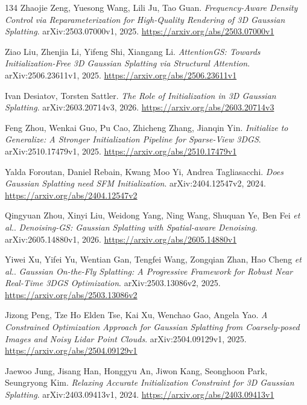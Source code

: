\documentclass[11pt,a4paper]{article}
\begin{document}
\begin{thebibliography}{134}
Zhaojie Zeng, Yuesong Wang, Lili Ju, Tao Guan.
\newblock \emph{Frequency-Aware Density Control via Reparameterization for High-Quality Rendering of 3D Gaussian Splatting}.
\newblock arXiv:2503.07000v1, 2025.
\newblock \url{https://arxiv.org/abs/2503.07000v1}

Ziao Liu, Zhenjia Li, Yifeng Shi, Xiangang Li.
\newblock \emph{AttentionGS: Towards Initialization-Free 3D Gaussian Splatting via Structural Attention}.
\newblock arXiv:2506.23611v1, 2025.
\newblock \url{https://arxiv.org/abs/2506.23611v1}

Ivan Desiatov, Torsten Sattler.
\newblock \emph{The Role of Initialization in 3D Gaussian Splatting}.
\newblock arXiv:2603.20714v3, 2026.
\newblock \url{https://arxiv.org/abs/2603.20714v3}

Feng Zhou, Wenkai Guo, Pu Cao, Zhicheng Zhang, Jianqin Yin.
\newblock \emph{Initialize to Generalize: A Stronger Initialization Pipeline for Sparse-View 3DGS}.
\newblock arXiv:2510.17479v1, 2025.
\newblock \url{https://arxiv.org/abs/2510.17479v1}

Yalda Foroutan, Daniel Rebain, Kwang Moo Yi, Andrea Tagliasacchi.
\newblock \emph{Does Gaussian Splatting need SFM Initialization}.
\newblock arXiv:2404.12547v2, 2024.
\newblock \url{https://arxiv.org/abs/2404.12547v2}

Qingyuan Zhou, Xinyi Liu, Weidong Yang, Ning Wang, Shuquan Ye, Ben Fei \emph{et al.}.
\newblock \emph{Denoising-GS: Gaussian Splatting with Spatial-aware Denoising}.
\newblock arXiv:2605.14880v1, 2026.
\newblock \url{https://arxiv.org/abs/2605.14880v1}

Yiwei Xu, Yifei Yu, Wentian Gan, Tengfei Wang, Zongqian Zhan, Hao Cheng \emph{et al.}.
\newblock \emph{Gaussian On-the-Fly Splatting: A Progressive Framework for Robust Near Real-Time 3DGS Optimization}.
\newblock arXiv:2503.13086v2, 2025.
\newblock \url{https://arxiv.org/abs/2503.13086v2}

Jizong Peng, Tze Ho Elden Tse, Kai Xu, Wenchao Gao, Angela Yao.
\newblock \emph{A Constrained Optimization Approach for Gaussian Splatting from Coarsely-posed Images and Noisy Lidar Point Clouds}.
\newblock arXiv:2504.09129v1, 2025.
\newblock \url{https://arxiv.org/abs/2504.09129v1}

Jaewoo Jung, Jisang Han, Honggyu An, Jiwon Kang, Seonghoon Park, Seungryong Kim.
\newblock \emph{Relaxing Accurate Initialization Constraint for 3D Gaussian Splatting}.
\newblock arXiv:2403.09413v1, 2024.
\newblock \url{https://arxiv.org/abs/2403.09413v1}


\end{thebibliography}
\end{document}
